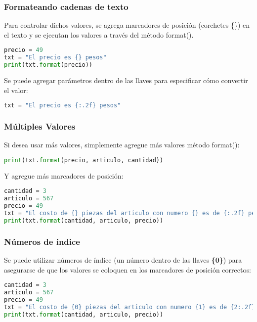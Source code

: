 \begin{frame}[fragile]
  \frametitle{Formateando cadenas de texto}

  Para controlar dichos valores, se agrega marcadores de posición
  (corchetes \{\}) en el texto y se ejecutan los valores a través del
  método \textcolor{codeKeyword2}{format}().

  \vspace{\baselineskip}
  \begin{lstlisting}[language=Python]
precio = 49
txt = "El precio es {} pesos"
print(txt.format(precio))
  \end{lstlisting}

  \pausa
  Se puede agregar parámetros dentro de las llaves para especificar cómo convertir el valor:

  \vspace{\baselineskip}
  \begin{lstlisting}[language=Python]
txt = "El precio es {:.2f} pesos"
  \end{lstlisting}
\end{frame}

\begin{frame}[fragile]
  \frametitle{Múltiples Valores}

  Si desea usar más valores, simplemente agregue más valores
  método \textcolor{codeKeyword2}{format}():

  \vspace{\baselineskip}
  \begin{lstlisting}[language=Python]
print(txt.format(precio, articulo, cantidad))
  \end{lstlisting}

  \pausa
  Y agregue más marcadores de posición: 

  \vspace{\baselineskip}
  \begin{lstlisting}[language=Python]
cantidad = 3
articulo = 567
precio = 49
txt = "El costo de {} piezas del articulo con numero {} es de {:.2f} pesos"
print(txt.format(cantidad, articulo, precio))
  \end{lstlisting}
\end{frame}

\begin{frame}[fragile]
  \frametitle{Números de indice}

  Se puede utilizar números de índice (un número dentro de las llaves
  \textbf{\{0\}}) para asegurarse de que los valores se coloquen en
  los marcadores de posición correctos: 

  \vspace{\baselineskip}
  \begin{lstlisting}[language=Python]
cantidad = 3
articulo = 567
precio = 49
txt = "El costo de {0} piezas del articulo con numero {1} es de {2:.2f} pesos"
print(txt.format(cantidad, articulo, precio))
  \end{lstlisting}
\end{frame}

